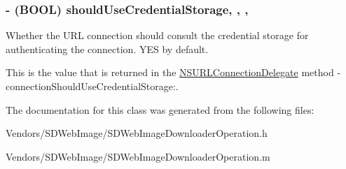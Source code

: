 \subsubsection[{should\+Use\+Credential\+Storage}]{\setlength{\rightskip}{0pt plus 5cm}-\/ (B\+O\+O\+L) should\+Use\+Credential\+Storage\hspace{0.3cm}{\ttfamily [read]}, {\ttfamily [write]}, {\ttfamily [nonatomic]}, {\ttfamily [assign]}}\label{interface_s_d_web_image_downloader_operation_a14ddcfc11ad65f0cff5c11e8cda517bc}
Whether the U\+R\+L connection should consult the credential storage for authenticating the connection. {\ttfamily Y\+E\+S} by default.

This is the value that is returned in the {\ttfamily \hyperlink{class_n_s_u_r_l_connection_delegate-p}{N\+S\+U\+R\+L\+Connection\+Delegate}} method {\ttfamily -\/connection\+Should\+Use\+Credential\+Storage\+:}. 

The documentation for this class was generated from the following files\+:\begin{DoxyCompactItemize}
\item 
Vendors/\+S\+D\+Web\+Image/S\+D\+Web\+Image\+Downloader\+Operation.\+h\item 
Vendors/\+S\+D\+Web\+Image/S\+D\+Web\+Image\+Downloader\+Operation.\+m\end{DoxyCompactItemize}
